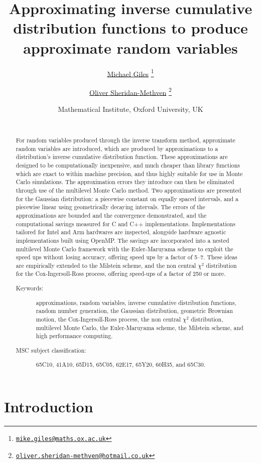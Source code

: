 \documentclass[9pt,a4paper,english]{extarticle}
\title{\Huge Approximating inverse cumulative distribution functions to produce approximate random variables}
\author{
\href{mailto:mike.giles@maths.ox.ac.uk}{Michael Giles}%
\thanks{\href{mailto:mike.giles@maths.ox.ac.uk}%
{\texttt{mike.giles@maths.ox.ac.uk}}} 
\and 
\href{mailto:oliver.sheridan-methven@hotmail.co.uk}{Oliver Sheridan-Methven}%
\thanks{\href{mailto:oliver.sheridan-methven@hotmail.co.uk}%
{\texttt{oliver.sheridan-methven@hotmail.co.uk}}}
}
\date{
Mathematical Institute, Oxford University, UK\\[1em]
\datedayname\ \nth{\number\day} \monthname\  \number\year}
\begin{document}
\maketitle

\begin{abstract}
For random variables produced through the inverse transform method, approximate random variables are introduced, which are produced by approximations to a distribution's inverse cumulative distribution function. These approximations are designed to be computationally inexpensive, and much cheaper than library functions which are exact to within machine precision, and thus highly suitable for use in Monte Carlo simulations. The approximation errors they introduce can then be eliminated through use of the multilevel Monte Carlo method.  Two approximations are presented for the Gaussian distribution: a piecewise constant on equally spaced intervals, and a piecewise linear using geometrically decaying intervals. The errors of the approximations are bounded and the convergence demonstrated, and the computational savings measured for C and C++ implementations. Implementations tailored for Intel and Arm hardwares are inspected, alongside hardware agnostic implementations built using OpenMP. The savings are incorporated into a nested multilevel Monte Carlo framework with the Euler-Maruyama scheme to exploit the speed ups without losing accuracy, offering speed ups by a factor of 5--7. These ideas are empirically extended to the Milstein scheme, and the non central $ \chi^2 $ distribution for the Cox-Ingersoll-Ross process, offering speed-ups of a factor of 250 or more.  

\begin{description}
\item[Keywords:] approximations, random variables, inverse cumulative distribution functions, random number generation, the Gaussian distribution, geometric Brownian motion, the Cox-Ingersoll-Ross process, the non central $ \chi^2 $ distribution, multilevel Monte Carlo, the Euler-Maruyama scheme, the Milstein scheme, and high performance computing.
\item[MSC subject classification:] 	65C10, 41A10, 65D15, 65C05, 62E17, 65Y20, 60H35, and 65C30.
\end{description}
\end{abstract}


\section{Introduction}
\label{sec:introduction}
\end{document}
